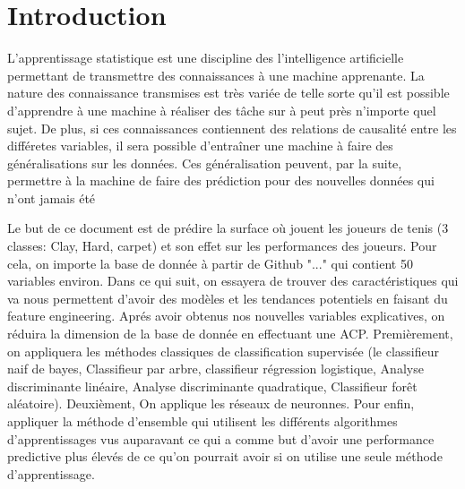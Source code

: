 \section{Introduction}

L'apprentissage statistique est une discipline des l'intelligence artificielle permettant de transmettre des connaissances à une machine apprenante. La nature des connaissance transmises est très variée de telle sorte qu'il est possible d'apprendre à une machine à réaliser des tâche sur à peut près n'importe quel sujet. De plus, si ces connaissances contiennent des relations de causalité entre les différetes variables, il sera possible d'entraîner une machine à faire des généralisations sur les données. Ces généralisation peuvent, par la suite, permettre à la machine de faire des prédiction pour des nouvelles données qui n'ont jamais été 





Le but de ce document est de prédire la surface où jouent les joueurs de tenis (3 classes: Clay, Hard, carpet) et son effet sur les performances des joueurs. Pour cela, on importe la base de donnée à partir de Github "..." qui contient 50 variables environ. Dans ce qui suit, on essayera de trouver des caractéristiques qui va nous permettent d'avoir des modèles et les tendances potentiels en faisant du feature engineering. Aprés avoir obtenus nos nouvelles variables explicatives, on réduira la dimension de la base de donnée en effectuant une ACP. Premièrement, on appliquera les méthodes classiques de classification supervisée (le classifieur naif de bayes, Classifieur par arbre, classifieur régression logistique, Analyse discriminante linéaire, Analyse discriminante quadratique, Classifieur forêt aléatoire). Deuxièment, On applique les réseaux de neuronnes. Pour enfin, appliquer la méthode d'ensemble qui  utilisent les différents algorithmes d'apprentissages vus auparavant ce qui a comme but d'avoir une performance predictive plus élevés de ce qu'on pourrait avoir si on utilise une seule méthode d'apprentissage.